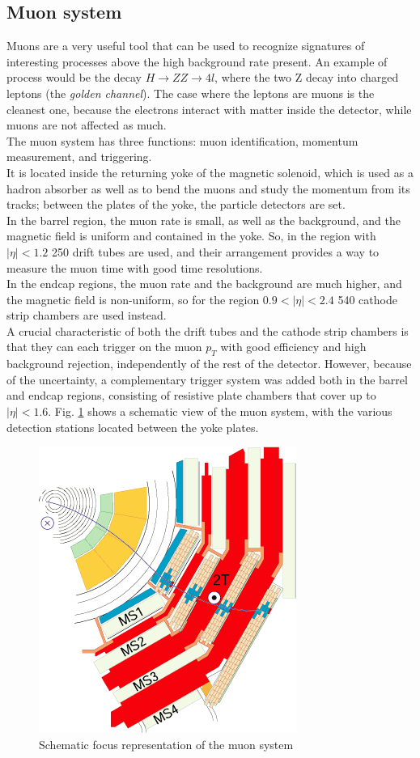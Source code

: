 \subsection{Muon system}
Muons are a very useful tool that can be used to recognize signatures of interesting processes above the high background rate present. An example of process would be the decay $H\rightarrow ZZ\rightarrow 4 l$, where the two Z decay into charged leptons (the \textit{golden channel}). The case where the leptons are muons is the cleanest one, because the electrons interact with matter inside the detector, while muons are not affected as much.\\
The muon system has three functions: muon identification, momentum measurement, and triggering. \\
It is located inside the returning yoke of the magnetic solenoid, which is used as a hadron absorber as well as to bend the muons and study the momentum from its tracks; between the plates of the yoke, the particle detectors are set.\\
In the barrel region, the muon rate is small, as well as the background, and the magnetic field is uniform and contained in the yoke. So, in the region with $|\eta|< 1.2$ 250 drift tubes are used, and their arrangement provides a way to measure the muon time with good time resolutions.\\
In the endcap regions, the muon rate and the background are much higher, and the magnetic field is non-uniform, so for the region $0.9<|\eta|<2.4$ 540 cathode strip chambers are used instead.\\
A crucial characteristic of both the drift tubes and the cathode strip chambers is that they can each trigger on the muon $p_T$ with good efficiency and high background rejection, independently of the rest of the detector. However, because of the uncertainty, a complementary trigger system was added both in the barrel and endcap regions, consisting of resistive plate chambers that cover up to $|\eta|<1.6$.
Fig. \ref{muon_system} shows a schematic view of the muon system, with the various detection stations located between the yoke plates.
\begin{figure}[ht]
    \centering
    \includegraphics[width = 0.5\linewidth]{images/MuStations.png}
    \caption{Schematic focus representation of the muon system}
    \label{muon_system}
\end{figure}
